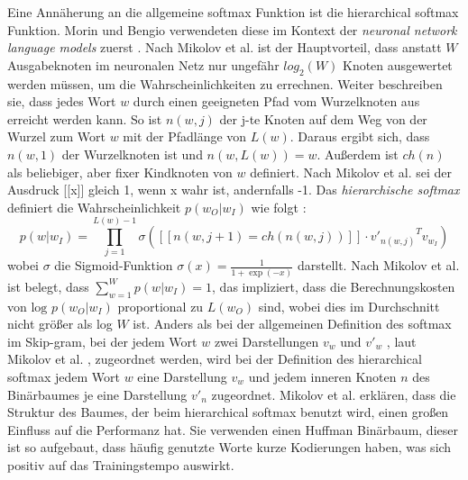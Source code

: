 \documentclass[12pt,a4paper]{report}
\begin{document}
Eine Annäherung an die allgemeine softmax Funktion ist die hierarchical softmax Funktion. Morin und Bengio verwendeten diese im Kontext der \textit{neuronal network language models} zuerst \cite{morin2005hierarchical}. Nach Mikolov et al. \cite{DBLP:journals/corr/MikolovSCCD13} ist der Hauptvorteil, dass anstatt $W$ Ausgabeknoten im neuronalen Netz nur ungefähr $log_2(W) $ Knoten ausgewertet werden müssen, um die Wahrscheinlichkeiten zu errechnen. Weiter beschreiben sie, dass jedes Wort $w$ durch einen geeigneten Pfad vom Wurzelknoten aus erreicht werden kann. So ist $n(w,j)$ der j-te Knoten auf dem Weg von der Wurzel zum Wort $w$ mit der Pfadlänge von $L(w)$. Daraus ergibt sich, dass $n(w,1)$ der Wurzelknoten ist und $n(w,L(w))=w$. Außerdem ist $ch(n)$ als beliebiger, aber fixer Kindknoten von $w$ definiert\citep{DBLP:journals/corr/MikolovSCCD13}. Nach Mikolov et al. \cite{DBLP:journals/corr/MikolovSCCD13} sei der Ausdruck [[x]]  gleich 1, wenn x wahr ist, andernfalls -1. Das \textit{hierarchische softmax} definiert die Wahrscheinlichkeit $p(w_O|w_I)$ wie folgt \cite{DBLP:journals/corr/MikolovSCCD13}:\\
 \begin{equation}
p(w|w_I)=  \prod_{j=1}^{L(w)-1} \sigma([[n(w,j+1) = ch(n(w,j))]]\cdot {v'_{n(w,j)}}^T v_{w_I } )
  \end{equation}
  wobei $\sigma$ die Sigmoid-Funktion $\sigma(x)=\frac{1}{1+\exp(-x)} $ darstellt.
Nach Mikolov et al. \cite{DBLP:journals/corr/MikolovSCCD13} ist belegt, dass $\sum_{w=1}^W p(w|w_I) = 1$, das impliziert, dass die Berechnungskosten von $\textrm{log } p(w_O|w_I)$ proportional zu $L(w_O)$ sind, wobei dies im Durchschnitt nicht größer als log $W$ ist. Anders als bei der allgemeinen Definition des softmax im Skip-gram, bei der jedem Wort $w$ zwei Darstellungen $v_w$ und $v'_w$ , laut Mikolov et al. \citep{DBLP:journals/corr/MikolovSCCD13}, zugeordnet werden, wird bei der Definition des hierarchical softmax jedem Wort $w$ eine Darstellung  $v_w$ und jedem inneren Knoten $n$ des Binärbaumes je eine Darstellung $v'_n$ zugeordnet.
Mikolov et al. \cite{DBLP:journals/corr/MikolovSCCD13} erklären, dass die Struktur des Baumes, der beim hierarchical softmax benutzt wird, einen großen Einfluss auf die Performanz hat. Sie verwenden einen Huffman Binärbaum, dieser ist so aufgebaut, dass häufig genutzte Worte kurze Kodierungen haben, was sich positiv auf das Trainingstempo auswirkt.\\
\end{document}
